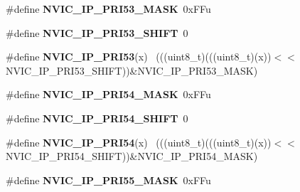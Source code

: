 \begin{DoxyCompactItemize}
\item 
\hypertarget{group___n_v_i_c___register___masks_ga87480496cdf8e266169a83531bd150f1}{}\#define {\bfseries N\+V\+I\+C\+\_\+\+I\+P\+\_\+\+P\+R\+I53\+\_\+\+M\+A\+S\+K}~0x\+F\+Fu\label{group___n_v_i_c___register___masks_ga87480496cdf8e266169a83531bd150f1}

\item 
\hypertarget{group___n_v_i_c___register___masks_ga610daeab51e073b2e19452d276256fc8}{}\#define {\bfseries N\+V\+I\+C\+\_\+\+I\+P\+\_\+\+P\+R\+I53\+\_\+\+S\+H\+I\+F\+T}~0\label{group___n_v_i_c___register___masks_ga610daeab51e073b2e19452d276256fc8}

\item 
\hypertarget{group___n_v_i_c___register___masks_ga12d11e3a51228566d0fca5ba8f0947bb}{}\#define {\bfseries N\+V\+I\+C\+\_\+\+I\+P\+\_\+\+P\+R\+I53}(x)                                              ~(((uint8\+\_\+t)(((uint8\+\_\+t)(x))$<$$<$N\+V\+I\+C\+\_\+\+I\+P\+\_\+\+P\+R\+I53\+\_\+\+S\+H\+I\+F\+T))\&N\+V\+I\+C\+\_\+\+I\+P\+\_\+\+P\+R\+I53\+\_\+\+M\+A\+S\+K)\label{group___n_v_i_c___register___masks_ga12d11e3a51228566d0fca5ba8f0947bb}

\item 
\hypertarget{group___n_v_i_c___register___masks_ga6bbb45fa6644101ef0c6a8aa94f67a92}{}\#define {\bfseries N\+V\+I\+C\+\_\+\+I\+P\+\_\+\+P\+R\+I54\+\_\+\+M\+A\+S\+K}~0x\+F\+Fu\label{group___n_v_i_c___register___masks_ga6bbb45fa6644101ef0c6a8aa94f67a92}

\item 
\hypertarget{group___n_v_i_c___register___masks_ga6598ea6ccc9274c8c5696374147d39ac}{}\#define {\bfseries N\+V\+I\+C\+\_\+\+I\+P\+\_\+\+P\+R\+I54\+\_\+\+S\+H\+I\+F\+T}~0\label{group___n_v_i_c___register___masks_ga6598ea6ccc9274c8c5696374147d39ac}

\item 
\hypertarget{group___n_v_i_c___register___masks_ga2f76a682da434bf66fb866cac8e1d94b}{}\#define {\bfseries N\+V\+I\+C\+\_\+\+I\+P\+\_\+\+P\+R\+I54}(x)                                              ~(((uint8\+\_\+t)(((uint8\+\_\+t)(x))$<$$<$N\+V\+I\+C\+\_\+\+I\+P\+\_\+\+P\+R\+I54\+\_\+\+S\+H\+I\+F\+T))\&N\+V\+I\+C\+\_\+\+I\+P\+\_\+\+P\+R\+I54\+\_\+\+M\+A\+S\+K)\label{group___n_v_i_c___register___masks_ga2f76a682da434bf66fb866cac8e1d94b}

\item 
\hypertarget{group___n_v_i_c___register___masks_gab70cc1d36ae3c84c22c43192125e2e7f}{}\#define {\bfseries N\+V\+I\+C\+\_\+\+I\+P\+\_\+\+P\+R\+I55\+\_\+\+M\+A\+S\+K}~0x\+F\+Fu\label{group___n_v_i_c___register___masks_gab70cc1d36ae3c84c22c43192125e2e7f}


\end{DoxyCompactItemize}
